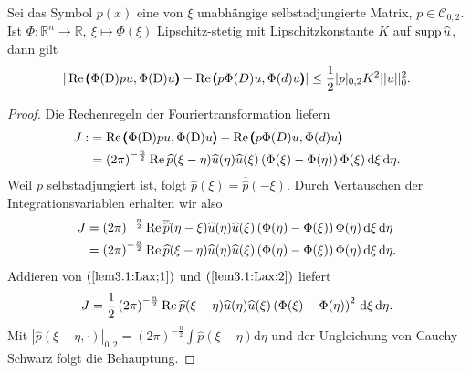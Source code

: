 \begin{lem}\label{lem3.1:Lax}
	Sei das Symbol $p(x)$ eine von $\xi$ unabhängige selbstadjungierte Matrix, $p\in \mathcal{C}_{0,2}$. Ist $\Phi: \mathbb{R}^n\rightarrow\mathbb{R}, \ \xi \mapsto\Phi(\xi)$ Lipschitz-stetig mit Lipschitzkonstante $K$ auf $\operatorname{supp} \widehat{u}$, dann gilt
	\begin{align}
		| \operatorname{Re} \pmb(\Phi(\mathrm D)pu,\Phi(\mathrm D)u\pmb)-\operatorname{Re}\pmb(p\Phi(D)u,\Phi(d)u\pmb)| \le\frac{1}{2}| p|_{0,2}K^2|| u||_0^2.
\end{align}	 
\end{lem}
\begin{proof}
	Die Rechenregeln der Fouriertransformation liefern
	\begin{align}\label{lem3.1:Lax;1}
		\begin{split} J:&=  \operatorname{Re} \pmb(\Phi(\mathrm D)pu,\Phi(\mathrm D)u\pmb)-\operatorname{Re}\pmb(p\Phi(D)u,\Phi(d)u\pmb) \\
		&= \left(2\pi\right)^{-\frac{n}{2}}\operatorname{Re}\relax\widehat{p}(\xi-\eta)\widehat{u}(\eta)\widehat{u}(\xi)\left(\Phi(\xi)-\Phi(\eta)\right)\Phi(\xi)\,\mathrm d \xi\,\mathrm d\eta.
		\end{split}
	\end{align}
	Weil $p$ selbstadjungiert ist, folgt $\widehat{p}(\xi) = \overline{\widehat{p}}(-\xi)$. Durch Vertauschen der Integrationsvariablen erhalten wir also
	\begin{align}\label{lem3.1:Lax;2}
	\begin{split}	J&= \left(2\pi\right)^{-\frac{n}{2}}\operatorname{Re}\relax\overline{\widehat{p}}(\eta-\xi)\widehat{u}(\eta)\widehat{u}(\xi)\left(\Phi(\eta)-\Phi(\xi)\right)\Phi(\eta)\,\mathrm d \xi\,\mathrm d\eta\\
		&= \left(2\pi\right)^{-\frac{n}{2}}\operatorname{Re}\relax\widehat{p}(\xi-\eta)\widehat{u}(\eta)\widehat{u}(\xi)\left(\Phi(\eta)-\Phi(\xi)\right)\Phi(\eta)\,\mathrm d \xi\,\mathrm d\eta.
	\end{split}	
	\end{align}
	Addieren von $(\ref{lem3.1:Lax;1})$ und $(\ref{lem3.1:Lax;2})$ liefert
	\begin{align}
		J= \frac{1}{2}\left(2\pi\right)^{-\frac{n}{2}}\operatorname{Re}\relax \widehat{p}(\xi-\eta)\widehat{u}(\eta)\widehat{u}(\xi)\left(\Phi(\xi)-\Phi(\eta)\right)^2\,\mathrm d\xi\,\mathrm d\eta.
	\end{align}
	Mit $| \widehat{p}(\xi-\eta,\cdot)|_{0,2} = (2\pi)^{-\frac{n}{2}}\int\widehat{p}(\xi-\eta)\mathrm{d}\eta$ und der Ungleichung von Cauchy-Schwarz folgt die Behauptung. 
\end{proof}

